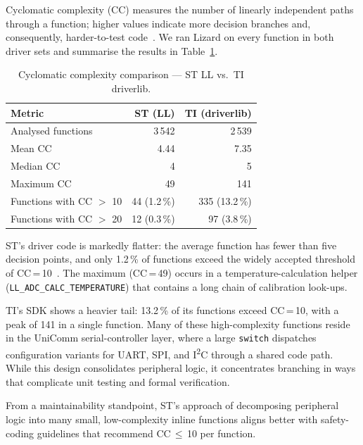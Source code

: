 Cyclomatic complexity (CC) measures the number of linearly independent paths through a
function; higher values indicate more decision branches and, consequently, harder-to-test
code~\cite{lizard-tool}. We ran Lizard on every function in both driver sets and
summarise the results in Table~\ref{tab:ti-complexity}.

\begin{table}[H]
\centering
\caption{Cyclomatic complexity comparison --- ST LL vs.\ TI driverlib.}
\label{tab:ti-complexity}
\begin{tabular}{l r r}
\toprule
\textbf{Metric} & \textbf{ST (LL)} & \textbf{TI (driverlib)} \\
\midrule
Analysed functions       &    3\,542 &    2\,539 \\
Mean CC                  &      4.44 &      7.35 \\
Median CC                &         4 &         5 \\
Maximum CC               &        49 &       141 \\
\midrule
Functions with CC $>$ 10 &    44 \scriptsize(1.2\,\%) &   335 \scriptsize(13.2\,\%) \\
Functions with CC $>$ 20 &    12 \scriptsize(0.3\,\%) &    97 \scriptsize(3.8\,\%) \\
\bottomrule
\end{tabular}
\end{table}

ST's driver code is markedly flatter: the average function has fewer than five decision
points, and only 1.2\,\% of functions exceed the widely accepted threshold of
CC\,=\,10~\cite{misra-c2012}. The maximum (CC\,=\,49) occurs in a temperature-calculation
helper (\texttt{LL\_ADC\_CALC\_TEMPERATURE}) that contains a long chain of calibration
look-ups.

TI's SDK shows a heavier tail: 13.2\,\% of its functions exceed CC\,=\,10, with a peak of
141 in a single function. Many of these high-complexity functions reside in the UniComm
serial-controller layer, where a large \texttt{switch} dispatches configuration variants
for UART, SPI, and I\textsuperscript{2}C through a shared code path. While this design
consolidates peripheral logic, it concentrates branching in ways that complicate unit testing
and formal verification.

From a maintainability standpoint, ST's approach of decomposing peripheral logic into many
small, low-complexity inline functions aligns better with safety-coding guidelines that
recommend CC\,$\leq$\,10 per function.

